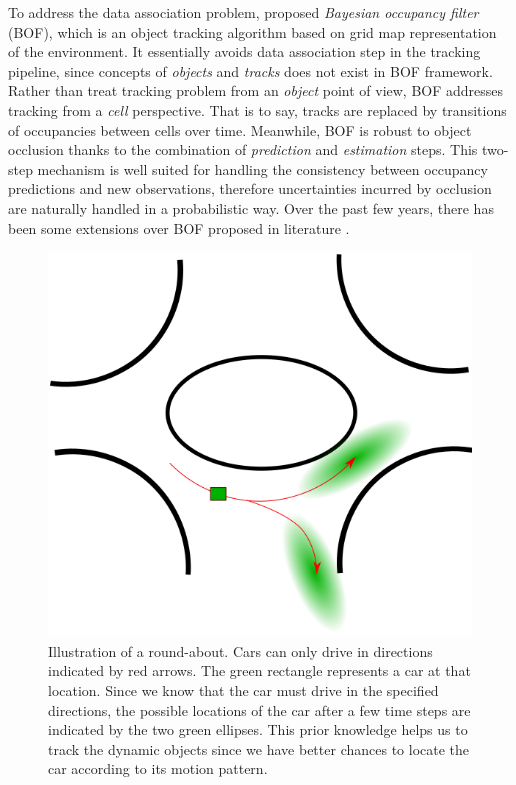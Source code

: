 To address the data association problem, \citet{coue2006bayesian} proposed \textit{Bayesian occupancy filter} (BOF), which is an object tracking algorithm based on grid map representation of the environment. It essentially avoids data association step in the tracking pipeline, since concepts of \textit{objects} and \textit{tracks} does not exist in BOF framework. Rather than treat tracking problem from an \textit{object} point of view, BOF addresses tracking from a \textit{cell} perspective. That is to say, tracks are replaced by transitions of occupancies between cells over time. Meanwhile, BOF is robust to object occlusion thanks to the combination of \textit{prediction} and \textit{estimation} steps. This two-step mechanism is well suited for handling the consistency between occupancy predictions and new observations, therefore uncertainties incurred by occlusion are naturally handled in a probabilistic way. Over the past few years, there has been some extensions over BOF proposed in literature \citep{gindele2009bayesian, brechtel2010recursive, llamazares2013dynamic}. 

\begin{figure}[H]
  \centering
    \includegraphics[width=.5\textwidth]{figures/roundabout.png}
    \caption[An illustration of a round-about]{Illustration of a round-about. Cars can only drive in directions indicated by red arrows. The green rectangle represents a car at that location. Since we know that the car must drive in the specified directions, the possible locations of the car after a few time steps are indicated by the two green ellipses. This prior knowledge helps us to track the dynamic objects since we have better chances to locate the car according to its motion pattern.}
    \label{fig:roundabout_idea}
\end{figure}

